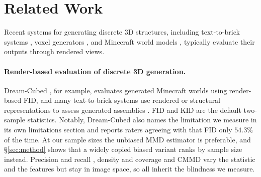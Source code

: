\section{Related Work}
\label{sec:related}

 Recent systems for generating discrete 3D structures, including text-to-brick systems \citep{pun2025brickgpt, kulits2026bricknet, ni2026brickanything}, voxel generators \citep{chen2019voxelcnn, jung2025scaffold, awiszus2021worldgan, earle2024dreamcraft}, and Minecraft world models \citep{earle2024dreamcraft}, typically evaluate their outputs through rendered views.

\paragraph{Render-based evaluation of discrete 3D generation.}
Dream-Cubed \citep{merino2026dreamcubed}, for example, evaluates generated Minecraft worlds using render-based FID, and many text-to-brick systems use rendered or structural representations to assess generated assemblies \citep{pun2025brickgpt,kulits2026bricknet,ni2026brickanything}. FID \citep{heusel2017fid} and KID
\citep{binkowski2018kid} are the default two-sample statistics. Notably, Dream-Cubed also names the limitation we
measure in its own limitations section and reports raters agreeing with that FID only
$54.3\%$ of the time. At our sample
sizes the unbiased MMD estimator \citep{gretton2012mmd} is preferable, and
\S\ref{sec:method} shows that a widely copied biased variant ranks by sample
size instead. Precision and recall \citep{kynkaanniemi2019precision}, density
and coverage \citep{naeem2020prdc} and CMMD \citep{jayasumana2024cmmd} vary the
statistic and the features but stay in image space, so all inherit the blindness
we measure. 



